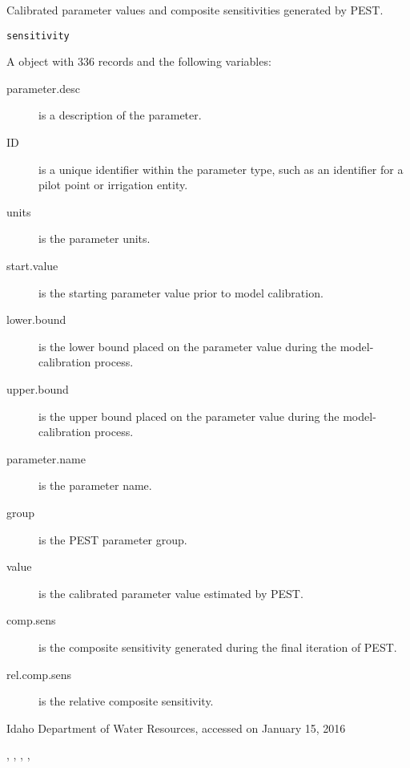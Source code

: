\documentclass[a4paper]{book}
\begin{document}
%
\begin{Description}\relax
Calibrated parameter values and composite sensitivities generated by PEST.
\end{Description}
%
\begin{Usage}
\begin{verbatim}
sensitivity
\end{verbatim}
\end{Usage}
%
\begin{Format}
A  object with 336 records and the following variables:
\begin{description}

\item[parameter.desc] is a description of the parameter.
\item[ID] is a unique identifier within the parameter type, such as an identifier for a pilot point or irrigation entity.
\item[units] is the parameter units.
\item[start.value] is the starting parameter value prior to model calibration.
\item[lower.bound] is the lower bound placed on the parameter value during the model-calibration process.
\item[upper.bound] is the upper bound placed on the parameter value during the model-calibration process.
\item[parameter.name] is the  parameter name.
\item[group] is the PEST parameter group.
\item[value] is the calibrated parameter value estimated by PEST.
\item[comp.sens] is the composite sensitivity generated during the final iteration of PEST.
\item[rel.comp.sens] is the relative composite sensitivity.

\end{description}

\end{Format}
%
\begin{Source}\relax
Idaho Department of Water Resources, accessed on January 15, 2016
\end{Source}
%
\begin{SeeAlso}\relax
{}, , , , 
\end{SeeAlso}
\end{document}
